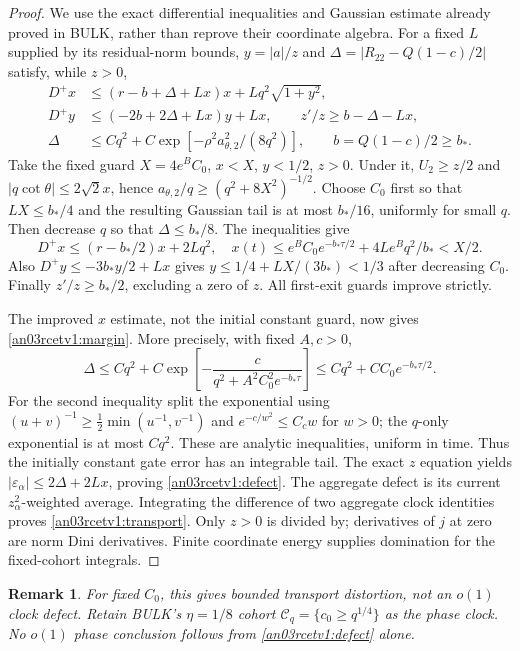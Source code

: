 \documentclass[11pt]{article}
\newtheorem{remark}[theorem]{Remark}
\begin{document}
\begin{proof}
We use the exact differential inequalities and Gaussian estimate
already proved in BULK, rather than reprove their coordinate algebra.
For a fixed $L$ supplied by its residual-norm bounds, $y=|a|/z$ and
$\Delta=|R_{22}-Q(1-c)/2|$ satisfy, while $z>0$,
\begin{align*}
 D^+x&\le(r-b+\Delta+Lx)x+Lq^2\sqrt{1+y^2},\\
 D^+y&\le(-2b+2\Delta+Lx)y+Lx,
 \qquad z'/z\ge b-\Delta-Lx,\\
 \Delta&\le Cq^2+C\exp[-\rho^2a_{\theta,2}^2/(8q^2)],
 \qquad b=Q(1-c)/2\ge b_*.
\end{align*}
Take the fixed guard $X=4e^BC_0$, $x<X$, $y<1/2$, $z>0$.
Under it, $U_2\ge z/2$ and
$|q\cot\theta|\le2\sqrt2x$, hence
$a_{\theta,2}/q\ge(q^2+8X^2)^{-1/2}$.
Choose $C_0$ first so that $LX\le b_*/4$ and the resulting
Gaussian tail is at most $b_*/16$, uniformly for small $q$.
Then decrease $q$ so that $\Delta\le b_*/8$. The inequalities give
\[
 D^+x\le(r-b_*/2)x+2Lq^2,
 \quad x(t)\le e^BC_0e^{-b_*\tau/2}+4Le^Bq^2/b_*<X/2.
\]
Also $D^+y\le-3b_*y/2+Lx$ gives
$y\le1/4+LX/(3b_*)<1/3$ after decreasing $C_0$.
Finally $z'/z\ge b_*/2$, excluding a zero of $z$.
All first-exit guards improve strictly.

The improved $x$ estimate, not the initial constant guard, now gives
\eqref{an03rcetv1:margin}. More precisely, with fixed $A,c>0$,
\[
 \Delta\le Cq^2+C\exp\!\left[-\frac{c}{q^2+A^2C_0^2e^{-b_*\tau}}\right]
 \le Cq^2+C C_0e^{-b_*\tau/2}.
\]
For the second inequality split the exponential using
$(u+v)^{-1}\ge\frac12\min(u^{-1},v^{-1})$ and
$e^{-c/w^2}\le C_c w$ for $w>0$; the $q$-only exponential
is at most $Cq^2$. These are analytic inequalities, uniform in time.
Thus the initially constant gate error has an integrable tail.
The exact $z$ equation yields
$|\varepsilon_\alpha|\le2\Delta+2Lx$, proving
\eqref{an03rcetv1:defect}. The aggregate defect is its current
$z_\alpha^2$-weighted average. Integrating the difference of two
aggregate clock identities proves \eqref{an03rcetv1:transport}.
Only $z>0$ is divided by; derivatives of $j$ at zero are norm Dini
derivatives. Finite coordinate energy supplies domination for the
fixed-cohort integrals.
\end{proof}

\begin{remark}\label{an03rcetv1:clock}
For fixed $C_0$, this gives bounded transport distortion, not an
$o(1)$ clock defect. Retain BULK's $\eta=1/8$ cohort
$\mathcal C_q=\{c_0\ge q^{1/4}\}$ as the phase clock.
No $o(1)$ phase conclusion follows from \eqref{an03rcetv1:defect} alone.
\end{remark}
\end{document}
